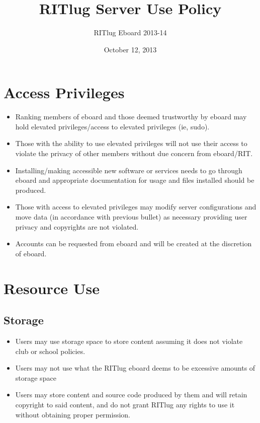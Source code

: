 \documentclass[a4paper]{article}
\title{RITlug Server Use Policy}
\author{RITlug Eboard 2013-14}
\date{October 12, 2013}
\begin{document}
\maketitle


\section{Access Privileges}

\begin{itemize}
\item Ranking members of eboard and those deemed trustworthy by eboard may hold elevated privileges/access to elevated privileges (ie, sudo).
\item Those with the ability to use elevated privileges will not use their access to violate the privacy of other members without due concern from eboard/RIT.
\item Installing/making accessible new software or services needs to go through eboard and appropriate documentation for usage and files installed should be produced.
\item Those with access to elevated privileges may modify server configurations and move data (in accordance with previous bullet) as necessary providing user privacy and copyrights are not violated.
\item Accounts can be requested from eboard and will be created at the discretion of eboard.
\end{itemize}

\section{Resource Use}

\subsection{Storage}
\begin{itemize}
\item Users may use storage space to store content assuming it does not violate club or school policies.
\item Users may not use what the RITlug eboard deems to be excessive amounts of storage space
\item Users may store content and source code produced by them and will retain copyright to said content, and do not grant RITlug any rights to use it without obtaining proper permission.

\end{itemize}
\end{document}
